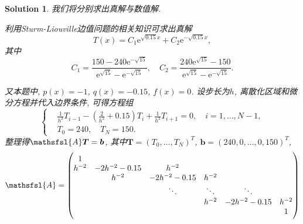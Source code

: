 \documentclass[a4paper, 12pt]{ctexart}
\theoremstyle{plain}
\theoremstyle{plain}
\theoremstyle{plain}
\theoremstyle{nonumberplain}
\newtheorem{solution}{Solution}
\newcommand*{\matr}[1]{\ensuremath{\mathsfsl{#1}}} %
\newcommand*{\me}{\mathrm{e}}
\newcommand*{\vect}[1]{\bm{#1}}
\begin{document}
    \begin{solution}
        我们将分别求出真解与数值解.
        
        利用Sturm-Liouville边值问题的相关知识可求出真解
        \begin{equation}
            T(x) = C_{1}\me^{\sqrt{0.15}x}+C_{2}\me^{-\sqrt{0.15}x},
        \end{equation}
        其中
        \begin{equation}
            C_{1} = \frac{150-240\me^{-\sqrt{15}}}{\me^{\sqrt{15}}-\me^{-\sqrt{15}}},
            \quad
            C_{2} = \frac{240\me^{\sqrt{15}}-150}{\me^{\sqrt{15}}-\me^{-\sqrt{15}}}.
        \end{equation}
        
        又本题中, $p(x)=-1$, $q(x)=-0.15$, $f(x)=0$. 设步长为$h$, 离散化区域和微分方程并代入边界条件, 可得方程组
        \begin{equation}
            \left\{
            \begin{aligned}
                &\frac{1}{h^{2}}T_{i-1}-\left(\frac{2}{h^{2}}+0.15\right)T_{i}+\frac{1}{h^{2}}T_{i+1}=0,\quad i=1,\dotsc,N-1,\\
                &T_{0}=240,\quad T_{N}=150.
            \end{aligned}
            \right.
        \end{equation}
        整理得$\matr{A}\vect{T}=\vect{b}$, 其中$\vect{T}=(T_{0},\dotsc,T_{N})^{T}$, $\vect{b}=(240, 0, \dotsc, 0, 150)^{T}$,
        \begin{equation}
            \matr{A}=
            \begin{pmatrix}
                1\\
                h^{-2} & -2h^{-2}-0.15 & h^{-2}\\
                & h^{-2} & -2h^{-2}-0.15 & h^{-2}\\
                & & \ddots & \ddots & \ddots\\
                & & & h^{-2} & -2h^{-2}-0.15 & h^{-2}\\
                & & & & & 1
            \end{pmatrix}
        \end{equation}


\end{solution}
\end{document}
